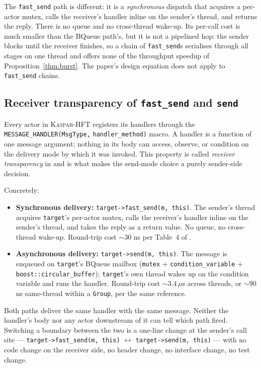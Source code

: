 \documentclass[11pt]{article}
\newcommand{\kasparhft}{\textsc{Kaspar-HFT}}
\begin{document}
The \texttt{fast\_send} path is different: it is a \emph{synchronous} dispatch that
acquires a per-actor mutex, calls the receiver's handler inline on the sender's thread,
and returns the reply. There is no queue and no cross-thread wake-up. Its per-call cost is
much smaller than the BQueue path's, but it is not a pipelined hop: the sender blocks
until the receiver finishes, so a chain of \texttt{fast\_send}s serialises through all
stages on one thread and offers none of the throughput speedup of
Proposition~\ref{thm:burst}. The paper's design equation does not apply to
\texttt{fast\_send} chains.

\subsection{Receiver transparency of \texttt{fast\_send} and \texttt{send}}
\label{sec:fungibility-transparency}

Every actor in \kasparhft{} registers its handlers through the
\texttt{MESSAGE\_HANDLER(MsgType,} \texttt{handler\_method)} macro. A handler is a function of one
message argument; nothing in its body can access, observe, or condition on the delivery
mode by which it was invoked. This property is called \emph{receiver transparency} in
\citet{mayeski_fastsend} and is what makes the send-mode choice a purely sender-side
decision.

Concretely:
\begin{itemize}
  \item \textbf{Synchronous delivery:} \texttt{target->fast\_send(m,\ this)}. The sender's
thread acquires \texttt{target}'s per-actor mutex, calls the receiver's handler inline on
the sender's thread, and takes the reply as a return value. No queue, no cross-thread
wake-up. Round-trip cost $\sim 30$ ns per Table~4 of \citet{mayeski_fastsend}.
  \item \textbf{Asynchronous delivery:} \texttt{target->send(m,\ this)}. The message is
enqueued on \texttt{target}'s BQueue mailbox (\texttt{mutex} $+$
\texttt{condition\_variable} $+$ \texttt{boost::circular\_buffer}); \texttt{target}'s own
thread wakes up on the condition variable and runs the handler. Round-trip cost $\sim
3.4\,\mu\mathrm{s}$ across threads, or $\sim 90$ ns same-thread within a \texttt{Group},
per the same reference.
\end{itemize}
Both paths deliver the same handler with the same message. Neither the handler's body nor
any actor downstream of it can tell which path fired. Switching a boundary between the two
is a one-line change at the sender's call site --- \texttt{target->fast\_send(m,\ this)}
$\leftrightarrow$ \texttt{target->send(m,\ this)} --- with no code change on the receiver
side, no header change, no interface change, no test change.
\end{document}
